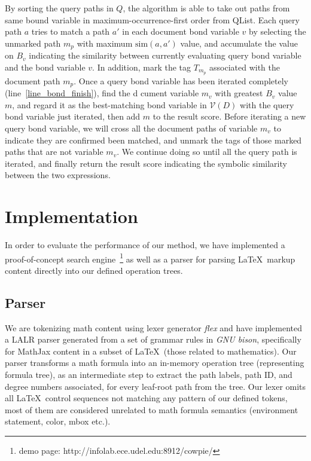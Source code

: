 \documentclass{acm_proc_article-sp}
\begin{document}
By sorting the query paths in $Q$, the algorithm is able to take out paths from same bound variable in maximum-occurrence-first order from QList. 
Each query path $a$ tries to match a path $a'$ in each document bond variable $v$ by selecting the unmarked path $m_p$ with maximum $\mathrm{sim}(a,a')$ value, and accumulate the value on $B_v$ indicating the similarity between currently evaluating query bond variable and the bond variable $v$.
In addition, mark the tag $T_{m_p}$ associated with the document path $m_p$.
Once a query bond variable has been iterated completely (line~\ref{line_bond_finish}),
find the d cument variable $m_v$ with greatest $B_v$ value $m$, and regard it as the best-matching bond variable in $\mathcal{V}(D)$ with the query bond variable just iterated, then add $m$ to the result score.
Before iterating a new query bond variable, we will cross all the document paths of variable $m_v$ to indicate they are confirmed been matched, 
and unmark the tags of those marked paths that are not variable $m_v$.
We continue doing so until all the query path is iterated, and finally return the result score indicating the symbolic similarity between the two expressions.

\section{Implementation}
In order to evaluate the performance of our method, we have implemented a proof-of-concept search engine~\footnote{demo page: http://infolab.ece.udel.edu:8912/cowpie/} as well as a parser for parsing \LaTeX\ markup content directly into our defined operation trees.

\subsection{Parser}
We are tokenizing math content using lexer generator \textit{flex} and have implemented a LALR parser generated from a set of grammar rules in \textit{GNU bison}, specifically for MathJax content in a subset of \LaTeX\ (those related to mathematics).
Our parser transforms a math formula into an in-memory operation tree (representing formula tree), as an intermediate step to extract the path labels, path ID, and degree numbers associated, for every leaf-root path from the tree. 
Our lexer omits all \LaTeX\ control sequences not matching any pattern of our defined tokens, most of them are considered unrelated to math formula semantics (environment statement, color, mbox etc.).
\end{document}
